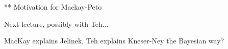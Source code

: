 \documentclass[ignorenonframetext]{beamer}
\begin{document}
** Motivation for Mackay-Peto

Next lecture, possibly with Teh...

MacKay explains Jelinek, Teh explains Kneser-Ney the Bayesian way?














\end{document}
